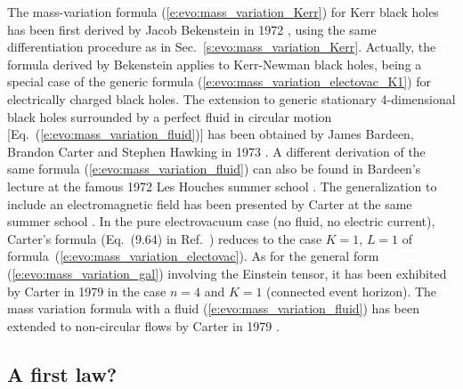 \begin{hist}
The mass-variation formula (\ref{e:evo:mass_variation_Kerr}) for Kerr black holes
has been first
derived by Jacob Bekenstein
in 1972 \cite{Beken73a,Beken73b}, using the same differentiation procedure as in
Sec.~\ref{s:evo:mass_variation_Kerr}. Actually, the
formula derived by Bekenstein applies to
Kerr-Newman black holes, being a special
case of the generic formula (\ref{e:evo:mass_variation_electovac_K1})
for electrically charged black holes.
The extension to generic stationary 4-dimensional black holes
surrounded by a perfect fluid in circular motion [Eq.~(\ref{e:evo:mass_variation_fluid})]
has been obtained by James Bardeen, Brandon Carter
and Stephen Hawking in 1973 \cite{BardeCH73}.
A different derivation of the same formula (\ref{e:evo:mass_variation_fluid})
can also be found in Bardeen's lecture at the famous 1972 Les Houches summer school
\cite{Barde73b}.
The generalization to include an electromagnetic field has been presented by Carter
at the same summer school \cite{Carte73b}. In the pure electrovacuum case
(no fluid, no electric current), Carter's formula (Eq.~(9.64) in Ref.~\cite{Carte73b})
reduces to the case $K=1$, $L=1$ of formula~(\ref{e:evo:mass_variation_electovac}).
As for the general form (\ref{e:evo:mass_variation_gal}) involving the Einstein tensor, it has been exhibited by Carter in 1979 \cite{Carte79c} in the case $n=4$ and $K=1$
(connected event horizon).
The mass variation formula with a fluid (\ref{e:evo:mass_variation_fluid}) has been extended to non-circular flows by Carter in 1979 \cite{Carte79b}.
\end{hist}


\subsection{A first law?}
\label{s:evo:a_first_law_question}

